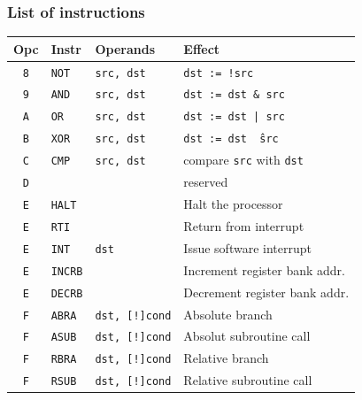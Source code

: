 \documentclass{beamer}
\begin{document}
   \begin{frame}
    \frametitle{List of instructions}
    \begin{center}
     \begin{tabular}{|c|ll|l|}
      \hline
       Opc&Instr&Operands&Effect\\
      \hline
       {\tt 8}&{\tt NOT}&{\tt src, dst}&{\tt dst := !src}\\
       {\tt 9}&{\tt AND}&{\tt src, dst}&{\tt dst := dst \& src}\\
       {\tt A}&{\tt OR}&{\tt src, dst}&{\tt dst := dst | src}\\
       {\tt B}&{\tt XOR}&{\tt src, dst}&{\tt dst := dst \^\ src}\\
       {\tt C}&{\tt CMP}&{\tt src, dst}&compare {\tt src} with {\tt dst}\\ 
       {\tt D}&&&reserved\\
       {\tt E}&{\tt HALT}&&Halt the processor\\
       {\tt E}&{\tt RTI}&&Return from interrupt\\
       {\tt E}&{\tt INT}&\texttt{dst}&Issue software interrupt\\
       {\tt E}&{\tt INCRB}&&Increment register bank addr.\\
       {\tt E}&{\tt DECRB}&&Decrement register bank addr.\\
       {\tt F}&{\tt ABRA}&{\tt dst, [!]cond}&Absolute branch\\
       {\tt F}&{\tt ASUB}&{\tt dst, [!]cond}&Absolut subroutine call\\
       {\tt F}&{\tt RBRA}&{\tt dst, [!]cond}&Relative branch\\
       {\tt F}&{\tt RSUB}&{\tt dst, [!]cond}&Relative subroutine call\\
      \hline
     \end{tabular}
    \end{center}
   \end{frame}
%
\end{document}
